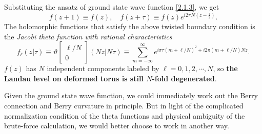 \documentclass[10pt,nofootinbib,letterpaper]{revtex4}
\begin{document}
		Substituting the ansatz of ground state wave function \eqref{2.1.3}, we get
		\begin{equation}\label{2.2.5}
			f(z+1)\equiv f(z),\quad f(z+\tau)\equiv f(z)e^{i2\pi N(z-\frac{\tau}{2})}.
		\end{equation}
		The holomorphic functions that satisfy the above twisted boundary condition is the \emph{Jacobi theta function with rational characteristics} \cite{wen2012modular}
		\begin{equation}\label{2.2.6}
			f_\ell(z|\tau)\equiv\vartheta\left[\begin{array}{c}
				\ell/N\\0
			\end{array}\right](Nz|N\tau)\equiv\sum_{m=-\infty}^\infty e^{i\pi\tau(m+\ell/N)^2+i2\pi(m+\ell/N)Nz}.
		\end{equation}
		$f(z)$ has $N$ independent components labeled by $\ell=0,1,2,\cdots,N$, so \textbf{the Landau level on deformed torus is still $N$-fold degenerated}.\par
		Given the ground state wave function, we could immediately work out the Berry connection and Berry curvature in principle. But in light of the complicated normalization condition of the theta functions and physical ambiguity of the brute-force calculation, we would better choose to work in another way.
\end{document}
